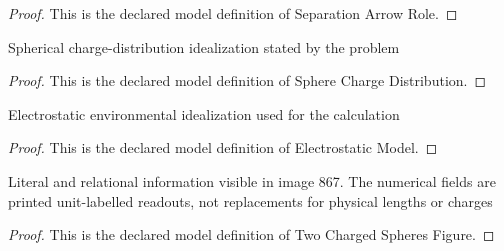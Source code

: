 \begin{proof}
  This is the declared model definition of Separation Arrow Role.
\end{proof}
\begin{definition}
  \label{def:physics:phyx-mini-0867:phyxminiproblems-problemphyxmini0867-spherechargedistribution}
  Spherical charge-distribution idealization stated by the problem
\end{definition}
\begin{proof}
  This is the declared model definition of Sphere Charge Distribution.
\end{proof}
\begin{definition}
  \label{def:physics:phyx-mini-0867:phyxminiproblems-problemphyxmini0867-electrostaticmodel}
  Electrostatic environmental idealization used for the calculation
\end{definition}
\begin{proof}
  This is the declared model definition of Electrostatic Model.
\end{proof}
\begin{definition}
  \label{def:physics:phyx-mini-0867:phyxminiproblems-problemphyxmini0867-twochargedspheresfigure}
  Literal and relational information visible in image 867. The numerical fields are printed unit-labelled readouts, not replacements for physical lengths or charges
\end{definition}
\begin{proof}
  This is the declared model definition of Two Charged Spheres Figure.
\end{proof}
